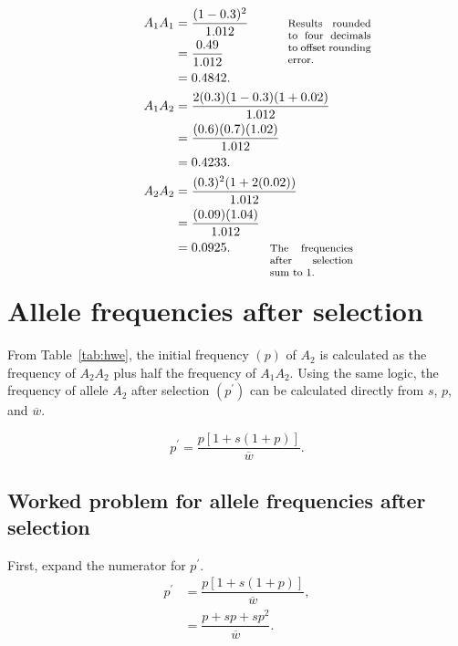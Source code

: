 \documentclass[letterpaper,nofonts]{tufte-handout}
\def\mathnote#1{%
  \tag*{\rlap{\hspace\marginparsep\smash{\parbox[t]{\marginparwidth}{%
  \footnotesize#1}}}}
}
\begin{document}
{
\setlength{\jot}{0.8em}
\begin{align*}
A_1A_1 &= \dfrac{(1-0.3)^2}{1.012} \mathnote{Results rounded to four decimals to offset rounding error.}\\
       &= \dfrac{0.49}{1.012}\\
       &= 0.4842.\\
A_1A_2 &= \dfrac{2(0.3)(1-0.3)(1 + 0.02)}{1.012} \\
	   &= \dfrac{(0.6)(0.7)(1.02)}{1.012}\\
	   &= 0.4233.\\
A_2A_2 &= \dfrac{(0.3)^2(1+2(0.02))}{1.012} \\
       &= \dfrac{(0.09)(1.04)}{1.012} \\
       &= 0.0925. \mathnote{The frequencies after selection sum to 1.}
\end{align*}
}

\section*{Allele frequencies after selection}

From Table~\ref{tab:hwe}, the initial frequency $(p)$ of $A_2$  is calculated as the frequency of $A_2A_2$ plus half the frequency of $A_1A_2.$ Using the same logic, the frequency of allele $A_2$ after selection $(p^\prime)$ can be calculated directly from $s$, $p$, and $\overline{w}$.

%
\begin{equation}\label{eq:p_prime}
p^\prime = \dfrac{p\left[1 + s(1+p)\right]}{\overline{w}}.
\end{equation}

\subsection*{Worked problem for allele frequencies after selection}

First, expand the numerator for $p^\prime$.
\begin{align*}
p^\prime &= \dfrac{p\left[1 +s(1 + p)\right]}{\overline{w}},\\
         &= \dfrac{p + sp + sp^2}{\overline{w}}.
\end{align*}
\end{document}
